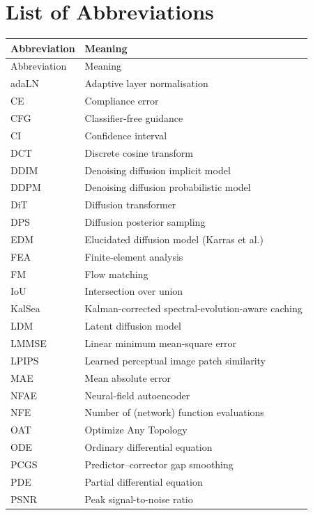 \chapter*{List of Abbreviations}
{\renewcommand{\arraystretch}{1.15}
\begin{longtable}{@{}ll@{}}
  \toprule
  Abbreviation & Meaning \\
  \midrule
  \endfirsthead
  \toprule
  Abbreviation & Meaning \\
  \midrule
  \endhead
  \bottomrule
  \endfoot
  adaLN & Adaptive layer normalisation \\
  CE & Compliance error \\
  CFG & Classifier-free guidance \\
  CI & Confidence interval \\
  DCT & Discrete cosine transform \\
  DDIM & Denoising diffusion implicit model \\
  DDPM & Denoising diffusion probabilistic model \\
  DiT & Diffusion transformer \\
  DPS & Diffusion posterior sampling \\
  EDM & Elucidated diffusion model (Karras et al.) \\
  FEA & Finite-element analysis \\
  FM & Flow matching \\
  IoU & Intersection over union \\
  KalSea & Kalman-corrected spectral-evolution-aware caching \\
  LDM & Latent diffusion model \\
  LMMSE & Linear minimum mean-square error \\
  LPIPS & Learned perceptual image patch similarity \\
  MAE & Mean absolute error \\
  NFAE & Neural-field autoencoder \\
  NFE & Number of (network) function evaluations \\
  OAT & Optimize Any Topology \\
  ODE & Ordinary differential equation \\
  PCGS & Predictor--corrector gap smoothing \\
  PDE & Partial differential equation \\
  PSNR & Peak signal-to-noise ratio \\

\end{longtable}}
